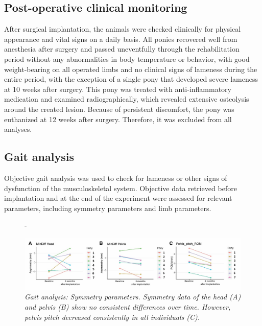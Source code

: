 \documentclass[twocolumn, empirical, authordate, issue]{jote-new-article}
\begin{document}
\subsection{Post-operative clinical monitoring} 

After surgical implantation, the animals were checked clinically for physical appearance and vital signs on a daily basis. All ponies recovered well from anesthesia after surgery and passed uneventfully through the rehabilitation period without any abnormalities in body temperature or behavior, with good weight-bearing on all operated limbs and no clinical signs of lameness during the entire period, with the exception of a single pony that developed severe lameness at 10 weeks after surgery. This pony was treated with anti-inflammatory medication and examined radiographically, which revealed extensive osteolysis around the created lesion. Because of persistent discomfort, the pony was euthanized at 12 weeks after surgery. Therefore, it was excluded from all analyses.

\subsection{Gait analysis} 

Objective gait analysis was used to check for lameness or other signs of dysfunction of the musculoskeletal system. Objective data retrieved before implantation and at the end of the experiment were assessed for relevant parameters, including symmetry parameters and limb parameters.
\begin{figure}[t!]
 \begin{adjustwidth}{-\fullwidthlen}{}

 \includegraphics[width=\textwidth +\fullwidthlen]{media/image6.jpg}

\caption{\emph{Gait analysis: Symmetry parameters. \textit{Symmetry data of the head (A) and pelvis (B) show no consistent differences over time. However, pelvis pitch decreased consistently in all individuals (C).}}}

\label{fig:figure6}
 \end{adjustwidth}
\end{figure}
\end{document}
